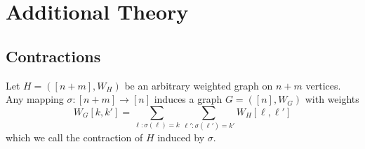 \documentclass{article}
\newcommand{\1}{\mathbf{1}}
\theoremstyle{alden}
\theoremstyle{aldenthm}
\theoremstyle{definition}
\theoremstyle{remark}
\begin{document}
\section{Additional Theory}

\subsection{Contractions}

Let $H = ([n + m], W_H)$ be an arbitrary weighted graph on $n + m$ vertices. Any mapping $\sigma: [n + m] \to [n]$ induces a graph $G = ([n], W_G)$ with weights
\begin{equation*}
W_G[k,k'] = \sum_{\ell: \sigma(\ell) = k} \sum_{\ell': \sigma(\ell') = k'} W_H[\ell,\ell']
\end{equation*}
which we call the contraction of $H$ induced by $\sigma$.
\end{document}
